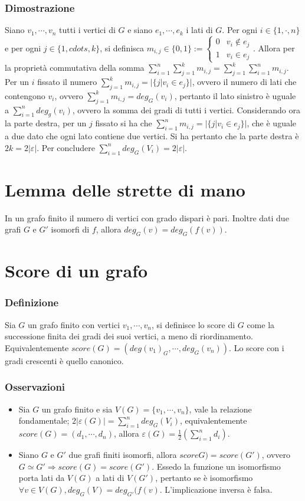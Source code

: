 \subsubsection{Dimostrazione}
Siano $v_1,\cdots, v_n$ tutti i vertici di $G$ e siano $e_1,\cdots, e_k$ i lati di $G$. Per ogni $i\in\{1,\cdot, n\}$ e per ogni $j\in\{1,cdots, k\}$, si definisca $m_{i,j}\in
\{0,1\}:=\begin{cases}0&v_i\not\in e_j\\1&v_i\in e_j\end{cases}$. Allora per la propriet\`a commutativa della somma $\sum\limits_{i=1}^n\sum\limits_{j=1}^k m_{i,j}=\sum
\limits_{j=1}^k\sum\limits_{i=1}^n m_{i,j}$. Per un $i$ fissato il numero $\sum\limits_{j=1}^k m_{i,j}=|\{j|v_i\in e_j\}|$, ovvero il numero di lati che contengono $v_i$, 
ovvero $\sum\limits_{j=1}^k m_{i,j}=deg_G(v_i)$, pertanto il lato sinistro \`e uguale a $\sum\limits_{i=1}^ndeg_g(v_i)$, ovvero la somma dei gradi di tutti i vertici. 
Considerando ora la parte destra, per un $j$ fissato si ha che $\sum\limits_{i=1}^nm_{i,j}=|\{j|v_i\in e_j\}|$, che \`e uguale a due dato che ogni lato contiene due vertici.
Si ha pertanto che la parte destra \`e $2k=2|\varepsilon|$. Per concludere $\sum\limits_{i=1}^ndeg_G(V_i)=2|\varepsilon|$. 
\section{Lemma delle strette di mano}
In un grafo finito il numero di vertici con grado dispari \`e pari. Inoltre dati due grafi $G$ e $G'$ isomorfi di $f$, allora $deg_G(v)=deg_G(f(v))$.
\section{Score di un grafo}
\subsubsection{Definizione}
Sia $G$ un grafo finito con vertici $v_1,\cdots, v_n$, si definisce lo score di $G$ come la successione finita dei gradi dei suoi vertici, a meno di riordinamento. 
Equivalentemente $score(G)=(deg(v_1)_G,\cdots, deg_G(v_n))$. Lo score con i gradi crescenti \`e quello canonico. 
\subsubsection{Osservazioni}
\begin{itemize}
\item Sia $G$ un grafo finito e sia $V(G)=\{v_1,\cdots, v_n\}$, vale la relazione fondamentale; $2|\varepsilon(G)|=\sum\limits_{i=1}^ndeg_G(V_i)$, equivalentemente 
$score(G)=(d_1,\cdots, d_n)$, allora $\varepsilon(G)=\frac{1}{2}(\sum\limits_{i=1}^nd_i)$.
\item Siano $G$ e $G'$ due grafi finiti isomorfi, allora $scoreG)=score(G')$, ovvero $G\simeq G'\Rightarrow score(G)=score(G')$. Essedo la funzione un isomorfismo porta lati da 
$V(G)$ a lati di $V(G')$, pertanto se \`e isomorfismo $\forall v\in V(G), deg_G(V)=deg_{G'}(f(v)$. L'implicazione inversa \`e falsa.
\end{itemize}
